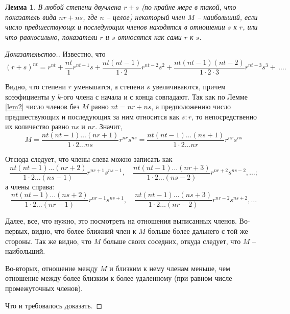 \documentclass[12pt]{article}
\newtheorem{lemma}{Лемма}
\begin{document}
\begin{lemma} \label{lem3}
В любой степени двучлена $r+s$ (по крайне мере в такой, что показатель вида $nr+ns$, где $n$ -- целое) некоторый член $M$ -- наибольший, если число предшествующх и последующих членов находятся в отношении $s$ к $r$, или что равносильно, показатели $r$ и $s$ относятся как сами $r$ к $s$.
\end{lemma}
\begin{proof}[Доказательство.]
 Известно, что $$(r+s)^{nt} = r^{nt}+\frac{nt}{1} r^{nt-1}s + \frac{nt (nt-1)}{1 \cdot 2}r^{nt-2}s^2 + \frac{nt (nt-1) (nt-2)}{1 \cdot 2 \cdot 3} r^{nt-3} s^3 + \,\dots.$$

Видно, что степени $r$ уменьшатся, а степени $s$ увеличиваются, причем коээфициенты у $k$-ого члена с начала и с конца совпадают.
Так как по Лемме \ref{lem2} число членов без $M$ равно $nt=nr+ns$, а предположению число предшествующих и последующих за ним относится как $s : r$, то непосредственно их количество равно $ns$ и $nr$.
Значит, $$M = \frac{nt (nt-1) \dots (nr+1)}{1 \cdot 2 \dots ns} r^{nr} s^{ns} = 
\frac{nt (nt-1) \dots (ns+1)}{1 \cdot 2 \dots nr} r^{nr} s^{ns} $$

Отсюда следует, что члены слева можно записать как
$$\frac{nt (nt-1) \dots (nr+2)}{1 \cdot 2 \dots (ns-1)} r^{nr+1} s^{ns-1}, \quad \frac{nt (nt-1) \dots (nr+3)}{1 \cdot 2 \dots (ns-2)} r^{nr+2} s^{ns-2}, \dots ;$$
а члены справа:
$$\frac{nt (nt-1) \dots (ns+2)}{1 \cdot 2 \dots (nr-1)} r^{nr-1} s^{ns+1}, \quad \frac{nt (nt-1) \dots (ns+3)}{1 \cdot 2 \dots (nr-2)} r^{nr-2} s^{ns+2}, \dots $$

Далее, все, что нужно, это посмотреть на отношения выписанных членов.
Во-первых, видно, что более ближний член к $M$ больше более дальнего с той же стороны.
Так же видно, что $M$ больше своих соседних, откуда следует, что $M$ -- наибольший.

Во-вторых, отношение между $M$ и близким к нему членам меньше, чем отношение между более близким к более удаленному (при равном числе промежуточных членов).

Что и требовалось доказать.
\end{proof}
\end{document}
